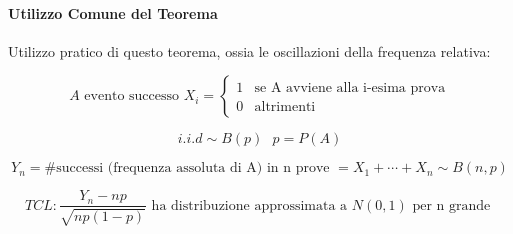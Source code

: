 \documentclass{article}
\begin{document}
\paragraph{Utilizzo Comune del Teorema} Utilizzo pratico di questo teorema, ossia le oscillazioni della frequenza relativa:

\[ A \text{ evento successo } X_{i} = 
\begin{cases} 
1 & \text{se A avviene alla i-esima prova} \\
0 & \text{altrimenti}
\end{cases}
\]

\[ i.i.d \sim B(p) \:\:\: p = P(A) \]

\[ Y_{n} = \#\text{successi} \text{ (frequenza assoluta di A) in n prove } = X_{1} + \cdots + X_{n} \sim B(n,p) \]

\[ TCL : \frac{Y_{n} - np}{\sqrt{np(1-p)}} \text{ ha distribuzione approssimata a } N(0,1) \text{ per n grande } \]


\newpage
\end{document}
